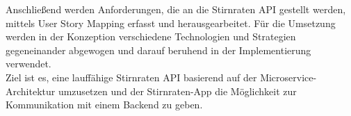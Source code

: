 Anschließend werden Anforderungen, die an die Stirnraten API gestellt werden, mittels User Story Mapping erfasst und herausgearbeitet. Für die Umsetzung werden in der Konzeption verschiedene Technologien und Strategien gegeneinander abgewogen und darauf beruhend in der Implementierung verwendet.\\ 

Ziel ist es, eine lauffähige Stirnraten API basierend auf der Microservice-Architektur umzusetzen und der Stirnraten-App die Möglichkeit zur Kommunikation mit einem Backend zu geben. \pagebreak
